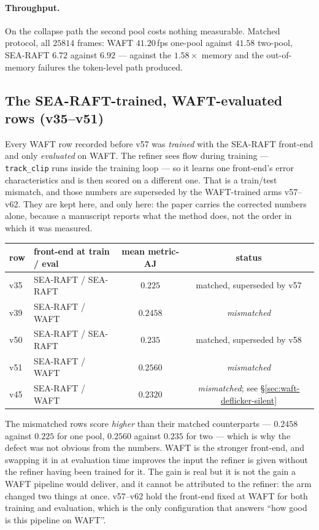 \documentclass[11pt,a4paper]{article}
\begin{document}
\paragraph{Throughput.} On the collapse path the second pool costs nothing measurable. Matched
protocol, all $25814$ frames: WAFT $41.20$\,fps one-pool against $41.58$ two-pool, SEA-RAFT $6.72$
against $6.92$ --- against the $1.58\times$ memory and the out-of-memory failures the token-level
path produced.

\subsection{The SEA-RAFT-trained, WAFT-evaluated rows (v35--v51)}
\label{sec:searaft-trained-waft-eval}

Every WAFT row recorded before v57 was \emph{trained} with the SEA-RAFT front-end and only
\emph{evaluated} on WAFT. The refiner sees flow during training --- \texttt{track\_clip} runs inside
the training loop --- so it learns one front-end's error characteristics and is then scored on a
different one. That is a train/test mismatch, and those numbers are superseded by the WAFT-trained
arms v57--v62. They are kept here, and only here: the paper carries the corrected numbers alone,
because a manuscript reports what the method does, not the order in which it was measured.

\begin{center}
\begin{tabular}{llcc}
\toprule
row & front-end at train / eval & mean metric-AJ & status \\
\midrule
v35 & SEA-RAFT / SEA-RAFT & $0.225$ & matched, superseded by v57 \\
v39 & SEA-RAFT / WAFT     & $0.2458$ & \emph{mismatched} \\
v50 & SEA-RAFT / SEA-RAFT & $0.235$ & matched, superseded by v58 \\
v51 & SEA-RAFT / WAFT     & $0.2560$ & \emph{mismatched} \\
\midrule
v45 & SEA-RAFT / WAFT     & $0.2320$ & \emph{mismatched}; see \S\ref{sec:waft-deflicker-silent} \\
\bottomrule
\end{tabular}
\end{center}

\noindent The mismatched rows score \emph{higher} than their matched counterparts --- $0.2458$
against $0.225$ for one pool, $0.2560$ against $0.235$ for two --- which is why the defect was not
obvious from the numbers. WAFT is the stronger front-end, and swapping it in at evaluation time
improves the input the refiner is given without the refiner having been trained for it. The gain is
real but it is not the gain a WAFT pipeline would deliver, and it cannot be attributed to the
refiner: the arm changed two things at once. v57--v62 hold the front-end fixed at WAFT for both
training and evaluation, which is the only configuration that answers ``how good is this pipeline
on WAFT''.
\end{document}
